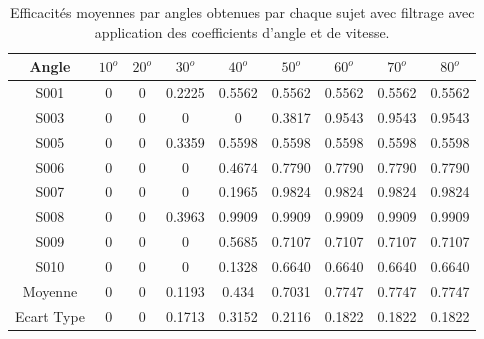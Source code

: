 \documentclass[letterpaper, twoside, 12pt, memoire, creativecommons, hyperref]{thETS}
\begin{document}
\begin{table}[ht]
	\caption{Efficacités moyennes par angles obtenues par chaque sujet avec filtrage avec application des coefficients d'angle et de vitesse. }
		\begin{tabular}{|c|c|c|c|c|c|c|c|c|}
		\hline
			Angle & $10^{o}$ & $20^{o}$ & $30^{o}$ & $40^{o}$ & $50^{o}$ & $60^{o}$ & $70^{o}$ & $80^{o}$\\
	    \hline
	    		S001 & 0 &  0 & 0.2225 & 0.5562 & 0.5562 & 0.5562 & 0.5562 & 0.5562\\
	    \hline
	    		S003 & 0 &  0 &  0 &  0 & 0.3817 & 0.9543 & 0.9543 & 0.9543\\
	    \hline
	    		S005 & 0 &  0 & 0.3359 & 0.5598 & 0.5598 & 0.5598 & 0.5598 & 0.5598\\
	    \hline
	    		S006 & 0 &  0 &  0 & 0.4674 & 0.7790 & 0.7790 & 0.7790 & 0.7790\\
	    \hline
	    		S007 & 0 &  0 &  0 & 0.1965 & 0.9824 & 0.9824 & 0.9824 & 0.9824\\
	    \hline
	    		S008 & 0 &  0 & 0.3963 & 0.9909 & 0.9909 & 0.9909 & 0.9909 & 0.9909\\
	    \hline
	    		S009 & 0 &  0 &  0 & 0.5685 & 0.7107 & 0.7107 & 0.7107 & 0.7107\\
	    \hline
	    		S010 & 0 &  0 &  0 & 0.1328 & 0.6640 & 0.6640 & 0.6640 & 0.6640\\
	    \hline
	    		Moyenne & 0 & 0 & 0.1193 & 0.434 & 0.7031 & 0.7747 & 0.7747 & 0.7747\\
	    \hline
	    		Ecart Type & 0 & 0 & 0.1713 & 0.3152 & 0.2116 & 0.1822 & 0.1822 & 0.1822\\
	    \hline
		\end{tabular}
	\label{tab:effanglecoeff}
\end{table}
\end{document}
